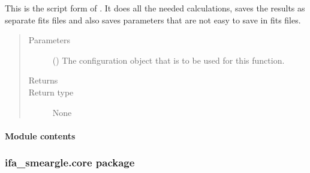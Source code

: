 \documentclass[letterpaper,10pt,english]{sphinxmanual}
\begin{document}

\begin{fulllineitems}
\label{\detokenize{docstrings/ifa_smeargle.analysis.histogram:ifa_smeargle.analysis.histogram.script_analysis_gaussian_histogram}}
This is the script form of .
It does all the needed calculations, saves the results as
separate fits files and also saves parameters that are not
easy to save in fits files.
\begin{quote}\begin{description}
\item[{Parameters}] \leavevmode
{} () \textendash{} The configuration object that is to be used for this
function.

\item[{Returns}] \leavevmode


\item[{Return type}] \leavevmode
None

\end{description}\end{quote}

\end{fulllineitems}



\paragraph{Module contents}
\label{\detokenize{docstrings/ifa_smeargle.analysis:module-ifa_smeargle.analysis}}\label{\detokenize{docstrings/ifa_smeargle.analysis:module-contents}}

\subsubsection{ifa\_smeargle.core package}
\label{\detokenize{docstrings/ifa_smeargle.core:ifa-smeargle-core-package}}\label{\detokenize{docstrings/ifa_smeargle.core::doc}}
\end{document}
